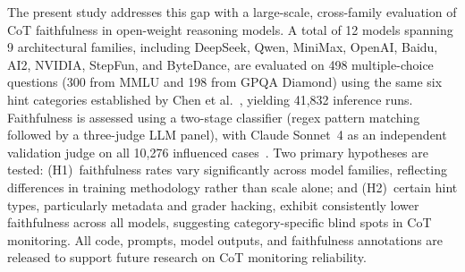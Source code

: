 The present study addresses this gap with a large-scale, cross-family
evaluation of CoT faithfulness in open-weight reasoning models. A total of 12
models spanning 9 architectural families, including DeepSeek, Qwen,
MiniMax, OpenAI, Baidu, AI2, NVIDIA, StepFun, and
ByteDance, are evaluated on 498
multiple-choice questions (300 from MMLU and 198 from GPQA Diamond) using the
same six hint categories established by Chen et al.~\cite{chen2025reasoning},
yielding 41,832 inference runs. Faithfulness is assessed using a two-stage
classifier (regex pattern matching followed by a three-judge LLM panel),
with Claude Sonnet~4 as an independent validation judge on all 10,276
influenced cases~\cite{young2026classifier}. Two primary hypotheses
are tested: (H1)~faithfulness rates vary significantly across model families,
reflecting differences in training methodology rather than scale alone; and
(H2)~certain hint types, particularly metadata and grader
hacking, exhibit consistently lower faithfulness across all models, suggesting
category-specific blind spots in CoT monitoring. All code, prompts, model outputs, and faithfulness
annotations are released to support future research on CoT monitoring
reliability.
